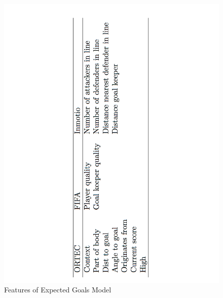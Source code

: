 \documentclass[sigconf]{acmart}
\begin{document}
\begin{figure}[h!]
\centering
\includegraphics[scale=.2]{features.pdf}
\caption{Features of Expected Goals Model \cite{ExpectedGoals}}
\label{fig: Features of Expected Goals Model}
\end{figure}
\end{document}
